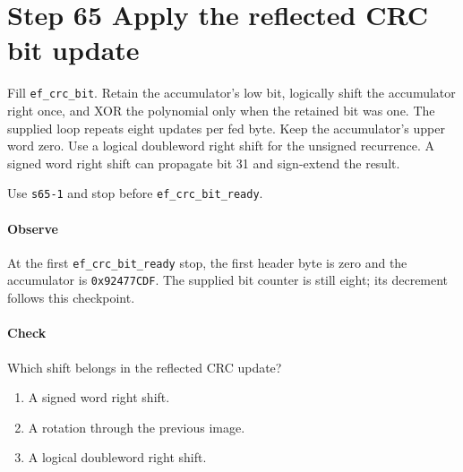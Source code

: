 \section{Step 65 Apply the reflected CRC bit update}
Fill \texttt{ef\_crc\_bit}. Retain the accumulator's low bit, logically shift the accumulator right once, and XOR the polynomial only when the retained bit was one. The supplied loop repeats eight updates per fed byte. Keep the accumulator's upper word zero. Use a logical doubleword right shift for the unsigned recurrence. A signed word right shift can propagate bit 31 and sign-extend the result.

Use \texttt{s65-1} and stop before \texttt{ef\_crc\_bit\_ready}.

\paragraph{Observe} At the first \texttt{ef\_crc\_bit\_ready} stop, the first header byte is zero and the accumulator is \texttt{0x92477CDF}. The supplied bit counter is still eight; its decrement follows this checkpoint.

\paragraph{Check} Which shift belongs in the reflected CRC update?
\begin{enumerate}[label=\Alph*.]
\item A signed word right shift.
\item A rotation through the previous image.
\item A logical doubleword right shift.
\end{enumerate}

